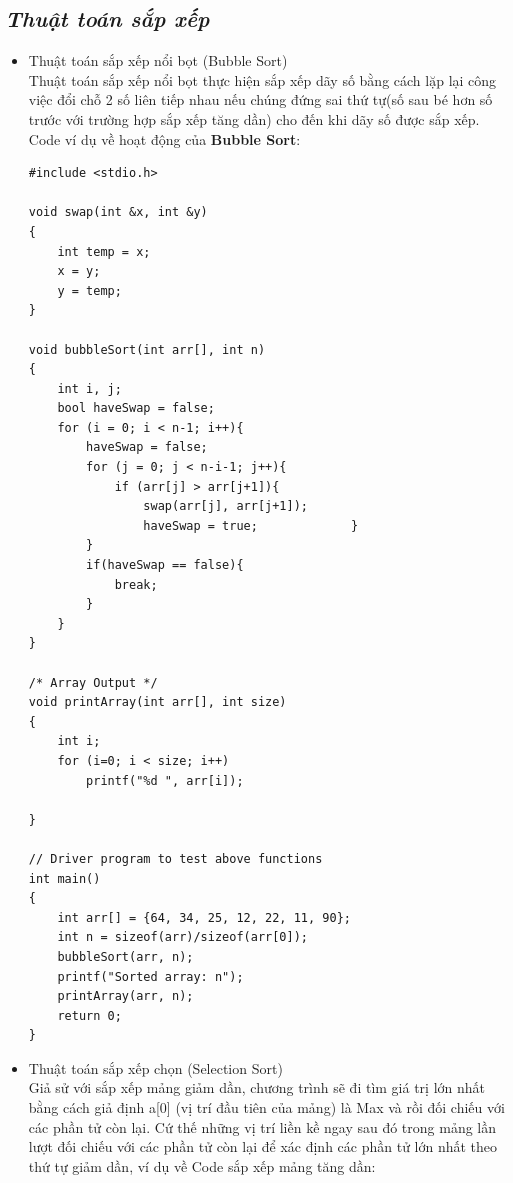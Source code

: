 \documentclass[12pt,a4paper]{article}
\begin{document}
\begin{center}
	\subsection*{\textbf{\textit{Thuật toán sắp xếp}}}
\end{center}
\begin{itemize}
	\item Thuật toán sắp xếp nổi bọt (Bubble Sort)\\
Thuật toán sắp xếp nổi bọt thực hiện sắp xếp dãy số bằng cách lặp lại công việc đổi chỗ 2 số liên tiếp nhau nếu chúng đứng sai thứ tự(số sau bé hơn số trước với trường hợp sắp xếp tăng dần) cho đến khi dãy số được sắp xếp. Code ví dụ về hoạt động của \textbf{Bubble Sort}: \\
\begin{lstlisting}
#include <stdio.h>
 
void swap(int &x, int &y)
{
    int temp = x;
    x = y;
    y = temp;
}

void bubbleSort(int arr[], int n)
{
    int i, j;
    bool haveSwap = false;
    for (i = 0; i < n-1; i++){
        haveSwap = false;
        for (j = 0; j < n-i-1; j++){
            if (arr[j] > arr[j+1]){
                swap(arr[j], arr[j+1]);
                haveSwap = true;             }
        }
        if(haveSwap == false){
            break;
        }
    }
}
 
/* Array Output */
void printArray(int arr[], int size)
{
    int i;
    for (i=0; i < size; i++)
        printf("%d ", arr[i]);

}
 
// Driver program to test above functions
int main()
{
    int arr[] = {64, 34, 25, 12, 22, 11, 90};
    int n = sizeof(arr)/sizeof(arr[0]);
    bubbleSort(arr, n);
    printf("Sorted array: n");
    printArray(arr, n);
    return 0;
}
\end{lstlisting}
	\item Thuật toán sắp xếp chọn (Selection Sort)\\
Giả sử với sắp xếp mảng giảm dần, chương trình sẽ đi tìm giá trị lớn nhất bằng cách giả định a[0] (vị trí đầu tiên của mảng) là Max và rồi đối chiếu với các phần tử còn lại. Cứ thế những vị trí liền kề ngay sau đó trong mảng lần lượt đối chiếu với các phần tử còn lại để xác định các phần tử lớn nhất theo thứ tự giảm dần, ví dụ về Code sắp xếp mảng tăng dần:\\
\begin{lstlisting}
	

\end{lstlisting}
\end{itemize}
\end{document}

